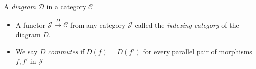 A \emph{diagram} $\mathcal{D}$ in a \href{doc/1 math/Seven Sketches in Compositionality/Chapter 3: Databases/2 Categories/1 Free Categories/1 Category}{category} $\mathcal{C}$

\begin{itemize}
    \item  A \href{doc/1 math/Seven Sketches in Compositionality/Chapter 3: Databases/3 Functors, natural transformations, and databases/2 Functors/1 Functor}{functor} $\mathcal{J}\xrightarrow{D}\mathcal{C}$ from any \href{doc/1 math/Seven Sketches in Compositionality/Chapter 3: Databases/2 Categories/1 Free Categories/1 Category}{category} $\mathcal{J}$ called the \emph{indexing category} of the diagram $D$.
    \item We say $D$ \emph{commutes} if $D(f)=D(f')$ for every parallel pair of morphisms $f,f'$ in $\mathcal{J}$

  \end{itemize}
